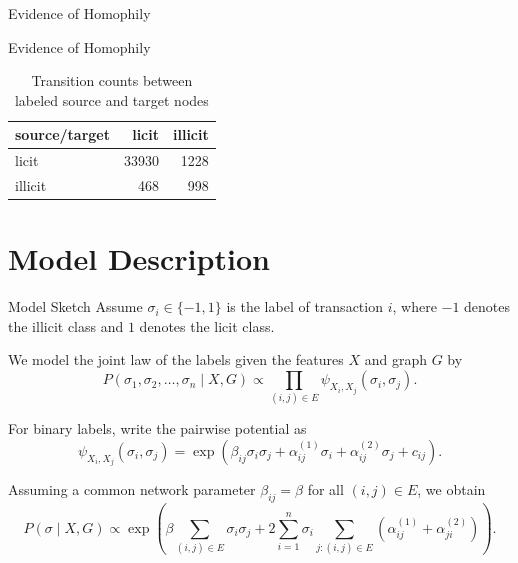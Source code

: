 \documentclass[aspectratio=169]{beamer}
\begin{document}
\begin{frame}{Evidence of Homophily}

    \begin{table}[htbp]
\centering
\caption{Neighborhood summary by node label}
\label{table:neighbor}
\end{table}
\end{frame}
\begin{frame}{Evidence of Homophily}
\small
\begin{table}[htbp]
\centering
\caption{Transition counts between labeled source and target nodes}
\begin{tabular}{lrr}
\toprule
source/target & licit & illicit \\
\midrule
licit   & 33930 & 1228 \\
illicit & 468   & 998 \\
\bottomrule
\end{tabular}
\label{table:transition}
\end{table}
\end{frame}

\section{Model Description}
\begin{frame}{Model Sketch}
\small
Assume $\sigma_i \in \{-1,1\}$ is the label of transaction $i$, where $-1$ denotes the illicit class and $1$ denotes the licit class.

\vspace{0.15cm}
We model the joint law of the labels given the features $X$ and graph $G$ by
\[
    P(\sigma_1,\sigma_2,\ldots,\sigma_n \mid X,G)
    \propto \prod_{(i,j)\in E} \psi_{X_i,X_j}(\sigma_i,\sigma_j).
\]

For binary labels, write the pairwise potential as
\[
    \psi_{X_i,X_j}(\sigma_i,\sigma_j)
    = \exp\!\left(\beta_{ij}\sigma_i\sigma_j + \alpha^{(1)}_{ij}\sigma_i+\alpha^{(2)}_{ij}\sigma_j + c_{ij}\right).
\]

Assuming a common network parameter $\beta_{ij}=\beta$ for all $(i,j)\in E$, we obtain
\[
P(\sigma \mid X,G)
\propto
\exp\!\left(
\beta \sum_{(i,j)\in E} \sigma_i\sigma_j
+ 2\sum_{i=1}^n \sigma_i \sum_{j:(i,j)\in E} (\alpha^{(1)}_{ij}+\alpha^{(2)}_{ji})
\right).
\]
\end{frame}
\end{document}
